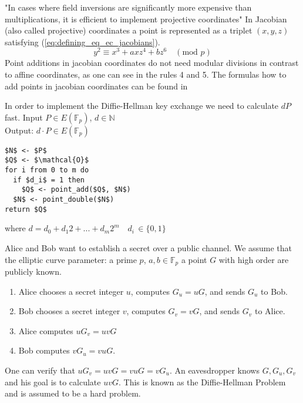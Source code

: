"In cases where field inversions are significantly more expensive than multiplications, it is efficient to implement projective coordinates" \cite{Blake:1999} In Jacobian (also called projective) coordinates a point is represented as a triplet $(x,y,z)$ satisfying (\ref{eq:defining_eq_ec_jacobians}).
\begin{equation}\label{eq:defining_eq_ec_jacobians}
y^2 \equiv x^3 + axz^4 + bz^6 \quad (\text{mod } p)
\end{equation}
Point additions in jacobian coordinates do not need modular divisions in contrast to affine coordinates, as one can see in the rules 4 and 5. The formulas how to add points in jacobian coordinates can be found in \cite[p. 59-60]{Blake:1999}

In order to implement the Diffie-Hellman key exchange we need to calculate $dP$ fast.
Input $P \in E(\mathbb{F}_p)$, $d \in \mathbb{N}$\\
Output: $d\cdot P \in E(\mathbb{F}_p)$
\begin{lstlisting}[frame=single, mathescape=true, captionpos=b, caption=double-and-add method, label=lst:double_and_add]
$N$ <- $P$
$Q$ <- $\mathcal{O}$
for i from 0 to m do
  if $d_i$ = 1 then
    $Q$ <- point_add($Q$, $N$)
  $N$ <- point_double($N$)
return $Q$
\end{lstlisting}
where $d = d_0 + d_1 2 + ... + d_m 2^m \quad d_i \, \in \{0,1\}$

Alice and Bob want to establish a secret over a public channel. We assume that the elliptic curve parameter: a prime $p$, $a, b \in \mathbb{F}_p$ a point $G$ with high order are publicly known.
\begin{enumerate}
\item{Alice chooses a secret integer $u$, computes $G_u = uG$, and sends $G_u$ to Bob.}
\item{Bob chooses a secret integer $v$, computes $G_v = vG$, and sends $G_v$ to Alice.}
\item{Alice computes $uG_v = uvG$}
\item{Bob computes $vG_u = vuG$.}
\end{enumerate}
One can verify that $uG_v = uvG = vuG = v G_u$. An eavesdropper knows $G, G_u, G_v$ and his goal is to calculate $uvG$. This is known as the Diffie-Hellman Problem and is assumed to be a hard problem. 


